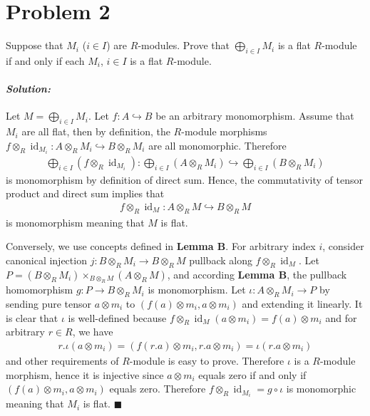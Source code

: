 \documentclass[12pt, a4paper]{article}
\newcommand{\id}{\operatorname{id}}
\theoremstyle{remark}
\newenvironment{solution}
  {\paragraph{\textit{Solution:}}\par\medskip}
  {\hfill$\blacksquare$\vspace{0.1cm}}
\begin{document}
\section*{Problem 2}
Suppose that $M_i$ ($i \in I$) are $R$-modules. Prove that $\bigoplus_{i \in I} M_i$ is a flat $R$-module if and only if each $M_i$, $i \in I$ is a flat $R$-module.
\begin{solution}
    Let $M=\bigoplus_{i\in I}M_i$. Let $f:A\hookrightarrow B$ be an arbitrary monomorphism. Assume that $M_i$ are all flat, then by definition, the $R$-module morphisms $f\otimes_R \id_{M_i}:A\otimes_R M_i\hookrightarrow B\otimes_R M_i$ are all
    monomorphic. Therefore
    \begin{align*}
        \bigoplus_{i\in I}(f\otimes_R \id_{M_i}):\bigoplus_{i\in I}(A\otimes_R M_i)\hookrightarrow \bigoplus_{i\in I} (B\otimes_R M_i)
    \end{align*}
    is monomorphism by definition of direct sum.
    Hence, the commutativity of tensor product and direct sum implies that 
    \begin{align*}
        f\otimes_R \id_{M}:A\otimes_R M \hookrightarrow B\otimes_R M
    \end{align*}
    is monomorphism meaning that $M$ is flat.

    Conversely, we use concepts defined in \textbf{Lemma B}. For arbitrary index $i$, consider canonical injection $j:B\otimes_R M_i\to B\otimes_R M$ pullback along $f\otimes_R \id_M$.
    Let $P= (B\otimes_R M_i)\times_{B\otimes_R M} (A\otimes_R M)$, and according \textbf{Lemma B}, the pullback homomorphism $g:P \to B\otimes_R M_i$ is monomorphism. Let $\iota:A\otimes_R M_i\to P$ by sending 
    pure tensor $a\otimes m_i$ to $(f(a)\otimes m_i,a\otimes m_i)$ and extending it linearly. It is clear that $\iota$ is well-defined because $f\otimes_R \id_M(a\otimes m_i) = f(a)\otimes m_i$ and for arbitrary $r\in R$, we have 
    \begin{align*}
        r.\iota(a\otimes m_i) = (f(r.a)\otimes m_i,r.a\otimes m_i) = \iota(r.a\otimes m_i)
    \end{align*}
    and other requirements of $R$-module is easy to prove. Therefore $\iota$ is a $R$-module morphism, hence it is injective since $a\otimes m_i$ equals zero if and only if $(f(a)\otimes m_i,a\otimes m_i)$ equals zero.
    Therefore $f\otimes_R \id_{M_i}= g\circ \iota$ is monomorphic meaning that $M_i$ is flat.
\end{solution}
\end{document}
